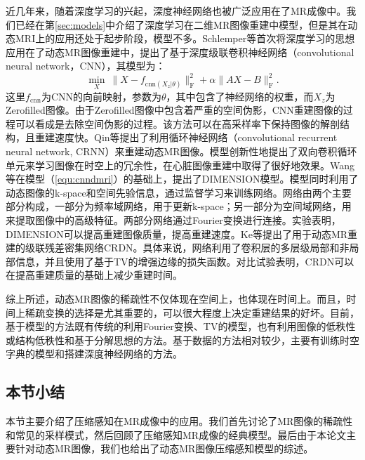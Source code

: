 近几年来，随着深度学习的兴起，深度神经网络也被广泛应用在了MR成像中。我们已经在第\ref{sec:models}中介绍了深度学习在二维MR图像重建中模型，但是其在动态MRI上的应用还处于起步阶段，模型不多。Schlemper等\cite{schlemper2017deep}首次将深度学习的思想应用在了动态MR图像重建中，提出了基于深度级联卷积神经网络（convolutional neural network，CNN），其模型为：
\begin{equation}
	\min_X \ \|X-f_{\mathrm{cnn}(X_z|\theta)}\|_\mathrm{F}^2+\alpha\|AX-B\|^2_\mathrm{F}.
	\label{equ:cnndmri}
\end{equation}
这里$f_{\mathrm{cnn}}$为CNN的向前映射，参数为$\theta$，其中包含了神经网络的权重，而$X_z$为Zerofilled图像。由于Zerofilled图像中包含着严重的空间伪影，CNN重建图像的过程可以看成是去除空间伪影的过程。该方法可以在高采样率下保持图像的解剖结构，且重建速度快。Qin等\cite{qin2018convolutional}提出了利用循环神经网络（convolutional recurrent neural network, CRNN）来重建动态MR图像。模型创新性地提出了双向卷积循环单元来学习图像在时空上的冗余性，在心脏图像重建中取得了很好地效果。Wang\cite{wang2018dimension}等在模型（\ref{equ:cnndmri}）的基础上，提出了DIMENSION模型。模型同时利用了动态图像的k-space和空间先验信息，通过监督学习来训练网络。网络由两个主要部分构成，一部分为频率域网络，用于更新k-space；另一部分为空间域网络，用来提取图像中的高级特征。两部分网络通过Fourier变换进行连接。实验表明，DIMENSION可以提高重建图像质量，提高重建速度。Ke等\cite{ke2019crdn}提出了用于动态MR重建的级联残差密集网络CRDN。具体来说，网络利用了卷积层的多层级局部和非局部信息，并且使用了基于TV的增强边缘的损失函数。对比试验表明，CRDN可以在提高重建质量的基础上减少重建时间。

综上所述，动态MR图像的稀疏性不仅体现在空间上，也体现在时间上。而且，时间上稀疏变换的选择是尤其重要的，可以很大程度上决定重建结果的好坏。目前，基于模型的方法既有传统的利用Fourier变换、TV的模型，也有利用图像的低秩性或结构低秩性和基于分解思想的方法。基于数据的方法相对较少，主要有训练时空字典的模型和搭建深度神经网络的方法。

\subsection{本节小结}
本节主要介绍了压缩感知在MR成像中的应用。我们首先讨论了MR图像的稀疏性和常见的采样模式，然后回顾了压缩感知MR成像的经典模型。最后由于本论文主要针对动态MR图像，我们也给出了动态MR图像压缩感知模型的综述。

